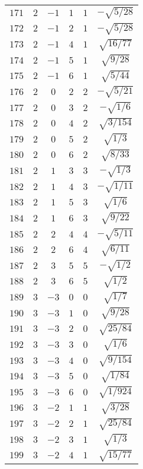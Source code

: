 \begin{table}
\begin{center}
\begin{tabular}{|c|c|c|c|c|c|}
$171$ & $2$ & $-1$ & $1$ & $1$ & $-\sqrt{5/28}$ \\ 
$172$ & $2$ & $-1$ & $2$ & $1$ & $-\sqrt{5/28}$ \\ 
$173$ & $2$ & $-1$ & $4$ & $1$ & $\sqrt{16/77}$ \\ 
$174$ & $2$ & $-1$ & $5$ & $1$ & $\sqrt{9/28}$ \\ 
$175$ & $2$ & $-1$ & $6$ & $1$ & $\sqrt{5/44}$ \\ 
$176$ & $2$ & $0$ & $2$ & $2$ & $-\sqrt{5/21}$ \\ 
$177$ & $2$ & $0$ & $3$ & $2$ & $-\sqrt{1/6}$ \\ 
$178$ & $2$ & $0$ & $4$ & $2$ & $\sqrt{3/154}$ \\ 
$179$ & $2$ & $0$ & $5$ & $2$ & $\sqrt{1/3}$ \\ 
$180$ & $2$ & $0$ & $6$ & $2$ & $\sqrt{8/33}$ \\ 
$181$ & $2$ & $1$ & $3$ & $3$ & $-\sqrt{1/3}$ \\ 
$182$ & $2$ & $1$ & $4$ & $3$ & $-\sqrt{1/11}$ \\ 
$183$ & $2$ & $1$ & $5$ & $3$ & $\sqrt{1/6}$ \\ 
$184$ & $2$ & $1$ & $6$ & $3$ & $\sqrt{9/22}$ \\ 
$185$ & $2$ & $2$ & $4$ & $4$ & $-\sqrt{5/11}$ \\ 
$186$ & $2$ & $2$ & $6$ & $4$ & $\sqrt{6/11}$ \\ 
$187$ & $2$ & $3$ & $5$ & $5$ & $-\sqrt{1/2}$ \\ 
$188$ & $2$ & $3$ & $6$ & $5$ & $\sqrt{1/2}$ \\ 
$189$ & $3$ & $-3$ & $0$ & $0$ & $\sqrt{1/7}$ \\ 
$190$ & $3$ & $-3$ & $1$ & $0$ & $\sqrt{9/28}$ \\ 
$191$ & $3$ & $-3$ & $2$ & $0$ & $\sqrt{25/84}$ \\ 
$192$ & $3$ & $-3$ & $3$ & $0$ & $\sqrt{1/6}$ \\ 
$193$ & $3$ & $-3$ & $4$ & $0$ & $\sqrt{9/154}$ \\ 
$194$ & $3$ & $-3$ & $5$ & $0$ & $\sqrt{1/84}$ \\ 
$195$ & $3$ & $-3$ & $6$ & $0$ & $\sqrt{1/924}$ \\ 
$196$ & $3$ & $-2$ & $1$ & $1$ & $\sqrt{3/28}$ \\ 
$197$ & $3$ & $-2$ & $2$ & $1$ & $\sqrt{25/84}$ \\ 
$198$ & $3$ & $-2$ & $3$ & $1$ & $\sqrt{1/3}$ \\ 
$199$ & $3$ & $-2$ & $4$ & $1$ & $\sqrt{15/77}$ \\ 

\end{tabular}
\end{center}
\end{table}
